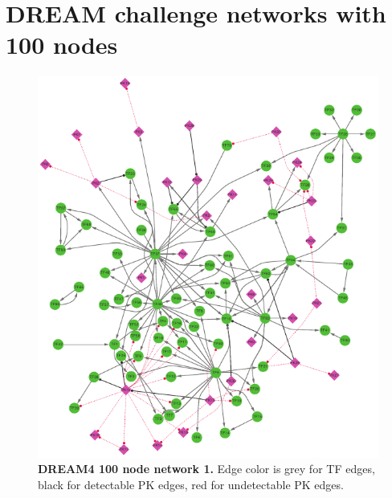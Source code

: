 \section{DREAM challenge networks with 100 nodes}
\label{app:dream_nets}

\begin{figure}[ht]
    \centering
    \includegraphics[width=\textwidth]{appendices/fig/net_100_1.pdf}
    \caption{\textbf{DREAM4 100 node network 1.} Edge color is grey for TF edges, black for detectable PK edges, red for undetectable PK edges.}
    \label{fig:dream4_net100.1}
\end{figure}

